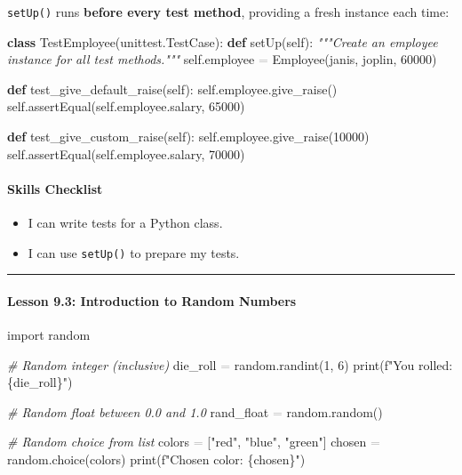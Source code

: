 \documentclass[
  justified,
  openright,
]{tufte-book}
\let\subsection\paragraph
\let\paragraph\paragraph
\newcommand{\KeywordTok}[1]{\textcolor{CodeKeyword}{\textbf{#1}}}  %
\newcommand{\StringTok}[1]{\textcolor{CodeString}{#1}}              %
\newcommand{\CommentTok}[1]{\textcolor{CodeComment}{\textit{#1}}}  %
\newcommand{\CodeNumTok}[1]{\textcolor{CodeNumber}{#1}}             %
\newcommand{\CodeAccentTok}[1]{\textcolor{CodeAccent}{#1}}          %
\newcommand{\OperatorTok}[1]{\textcolor{DarkGray}{#1}}              %
\newenvironment{Shaded}{%
  \begin{mdframed}[style=TufteCode]%
}{%
  \end{mdframed}%
}
\let\subsection\paragraph
\let\paragraph\paragraph
\providecommand{\tightlist}{%
  \setlength{\itemsep}{0pt}\setlength{\parskip}{0pt}}
\begin{document}
\texttt{setUp()} runs \textbf{before every test method}, providing a
fresh instance each time:

\begin{Shaded}
\begin{Highlighting}[]
\KeywordTok{class} TestEmployee(unittest.TestCase):
    \KeywordTok{def} setUp(self):
        \CommentTok{"""Create an employee instance for all test methods."""}
        self.employee \OperatorTok{=} Employee(\StringTok{\textquotesingle{}janis\textquotesingle{}}, \StringTok{\textquotesingle{}joplin\textquotesingle{}}, \CodeNumTok{60000})
 
    \KeywordTok{def} test\_give\_default\_raise(self):
        self.employee.give\_raise()
        self.assertEqual(self.employee.salary, \CodeNumTok{65000})
 
    \KeywordTok{def} test\_give\_custom\_raise(self):
        self.employee.give\_raise(\CodeNumTok{10000})
        self.assertEqual(self.employee.salary, \CodeNumTok{70000})
\end{Highlighting}
\end{Shaded}

\subsection{Skills Checklist}\label{skills-checklist-43}

\begin{itemize}
\tightlist
\item[$\square$]
  I can write tests for a Python class.
\item[$\square$]
  I can use \texttt{setUp()} to prepare my tests.
\end{itemize}

\begin{center}\rule{0.5\linewidth}{0.5pt}\end{center}

\subsection{Lesson 9.3: Introduction to Random
Numbers}\label{lesson-9.3-introduction-to-random-numbers}

\begin{Shaded}
\begin{Highlighting}[]
\CodeAccentTok{import} random
 
\CommentTok{\# Random integer (inclusive)}
die\_roll \OperatorTok{=} random.randint(\CodeNumTok{1}, \CodeNumTok{6})
print(\StringTok{f"You rolled: }\StringTok{\{}die\_roll\StringTok{\}}\StringTok{"})
 
\CommentTok{\# Random float between 0.0 and 1.0}
rand\_float \OperatorTok{=} random.random()
 
\CommentTok{\# Random choice from list}
colors \OperatorTok{=} [\StringTok{"red"}, \StringTok{"blue"}, \StringTok{"green"}]
chosen \OperatorTok{=} random.choice(colors)
print(\StringTok{f"Chosen color: }\StringTok{\{}chosen\StringTok{\}}\StringTok{"})
\end{Highlighting}
\end{Shaded}
\end{document}
